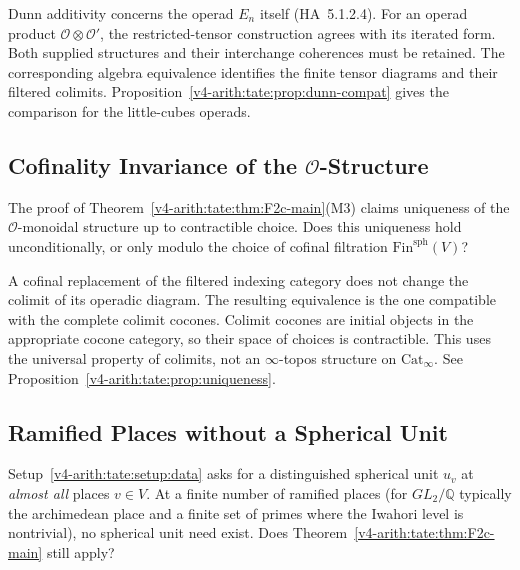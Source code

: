 \begin{correction}
Dunn additivity concerns the operad \(E_n\) itself (HA~5.1.2.4).
For an operad product \(\mathcal O\otimes\mathcal O'\), the
restricted-tensor construction agrees with its iterated form.
Both supplied structures and their interchange coherences must
be retained. The corresponding algebra equivalence identifies
the finite tensor diagrams and their filtered colimits.
Proposition~\ref{v4-arith:tate:prop:dunn-compat} gives the
comparison for the little-cubes operads.
\end{correction}

\subsection{Cofinality Invariance of the \(\mathcal{O}\)-Structure}

\begin{obstruction}
The proof of Theorem~\ref{v4-arith:tate:thm:F2c-main}(M3) claims uniqueness
of the \(\mathcal{O}\)-monoidal structure up to contractible choice.
Does this uniqueness hold unconditionally, or only modulo the choice
of cofinal filtration \(\mathrm{Fin}^{\mathrm{sph}}(V)\)?
\end{obstruction}

\begin{correction}
A cofinal replacement of the filtered indexing category does not
change the colimit of its operadic diagram. The resulting
equivalence is the one compatible with the complete colimit
cocones. Colimit cocones are initial objects in the appropriate
cocone category, so their space of choices is contractible.
This uses the universal property of colimits, not an
\(\infty\)-topos structure on \(\mathrm{Cat}_\infty\).
See Proposition~\ref{v4-arith:tate:prop:uniqueness}.
\end{correction}

\subsection{Ramified Places without a Spherical Unit}

\begin{obstruction}
Setup~\ref{v4-arith:tate:setup:data} asks for a distinguished
spherical unit \(u_{v}\) at \emph{almost all} places \(v\in V\). At a
finite number of ramified places (for \(GL_{2}/\mathbb{Q}\) typically
the archimedean place and a finite set of primes where the Iwahori
level is nontrivial), no spherical unit need exist. Does
Theorem~\ref{v4-arith:tate:thm:F2c-main} still apply?
\end{obstruction}

